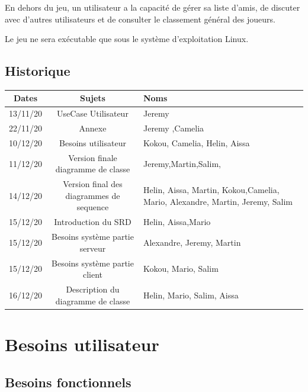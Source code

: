 \documentclass[a4paper,12pt]{article}
\begin{document}
En dehors du jeu, un utilisateur a la capacité de gérer sa liste d'amis, de discuter avec d'autres utilisateurs et de consulter le classement général des joueurs.

Le jeu ne sera exécutable que sous le système d'exploitation Linux.

\subsection{Historique}
\begin{tabularx}{15cm}{|c|c|X|}
	\hline
		Dates & Sujets & Noms \\
	\hline
		13/11/20 & UseCase Utilisateur & Jeremy \\
	
		22/11/20 & Annexe & Jeremy ,Camelia \\
	
		10/12/20 & Besoins utilisateur & Kokou, Camelia, Helin, Aissa\\
	
		11/12/20 & Version finale diagramme de classe  & Jeremy,Martin,Salim,\\
	
		14/12/20 & Version final des diagrammes de sequence & Helin, Aissa, Martin, Kokou,Camelia, 
		Mario, Alexandre, Martin, Jeremy, Salim\\
	
		15/12/20 & Introduction du SRD & Helin, Aissa,Mario\\
	
		15/12/20 & Besoins système partie serveur & Alexandre, Jeremy, Martin\\
	
		15/12/20 & Besoins système partie client & Kokou, Mario, Salim\\
	 
		16/12/20 & Description du diagramme de classe & Helin, Mario, Salim, Aissa \\
	\hline

\end{tabularx}

\section{Besoins utilisateur}

\subsection{Besoins fonctionnels}
\end{document}
